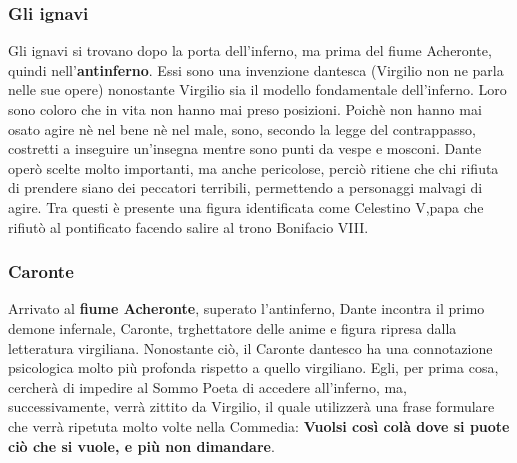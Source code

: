 \documentclass[10pt,a4paper]{article}
\begin{document}
		\subsubsection{Gli ignavi} 
		
		Gli ignavi si trovano dopo la porta dell'inferno, ma prima del fiume Acheronte, quindi nell'\textbf{antinferno}. Essi sono una invenzione dantesca (Virgilio non ne parla nelle sue opere) nonostante Virgilio sia il modello fondamentale dell'inferno. Loro sono coloro che in vita non hanno mai preso posizioni. Poichè non hanno mai osato agire nè nel bene nè nel male, sono, secondo la legge del contrappasso, costretti a inseguire un'insegna mentre sono punti da vespe e mosconi. Dante operò scelte molto importanti, ma anche pericolose, perciò ritiene che chi rifiuta di prendere siano dei peccatori terribili, permettendo a personaggi malvagi di agire. Tra questi è presente una figura identificata come Celestino V,papa che rifiutò al pontificato facendo salire al trono Bonifacio VIII.
		
		\subsubsection{Caronte}
		
		Arrivato al \textbf{fiume Acheronte}, superato l'antinferno, Dante incontra il primo demone infernale, Caronte, trghettatore delle anime e figura ripresa dalla letteratura virgiliana. Nonostante ciò, il Caronte dantesco ha una connotazione psicologica molto più profonda rispetto a quello virgiliano. Egli, per prima cosa, cercherà di impedire al Sommo Poeta di accedere all'inferno, ma, successivamente, verrà zittito da Virgilio, il quale utilizzerà una frase formulare che verrà ripetuta molto volte nella Commedia: \textbf{Vuolsi così colà dove si puote ciò che si vuole, e più non dimandare}.
 	
\end{document}
